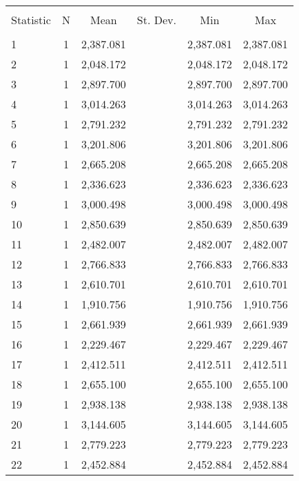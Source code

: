 
\begin{table}[!htbp] \centering 
  \caption{} 
  \label{} 
\begin{tabular}{@{\extracolsep{5pt}}lccccc} 
\\[-1.8ex]\hline 
\hline \\[-1.8ex] 
Statistic & \multicolumn{1}{c}{N} & \multicolumn{1}{c}{Mean} & \multicolumn{1}{c}{St. Dev.} & \multicolumn{1}{c}{Min} & \multicolumn{1}{c}{Max} \\ 
\hline \\[-1.8ex] 
1 & 1 & 2,387.081 &  & 2,387.081 & 2,387.081 \\ 
2 & 1 & 2,048.172 &  & 2,048.172 & 2,048.172 \\ 
3 & 1 & 2,897.700 &  & 2,897.700 & 2,897.700 \\ 
4 & 1 & 3,014.263 &  & 3,014.263 & 3,014.263 \\ 
5 & 1 & 2,791.232 &  & 2,791.232 & 2,791.232 \\ 
6 & 1 & 3,201.806 &  & 3,201.806 & 3,201.806 \\ 
7 & 1 & 2,665.208 &  & 2,665.208 & 2,665.208 \\ 
8 & 1 & 2,336.623 &  & 2,336.623 & 2,336.623 \\ 
9 & 1 & 3,000.498 &  & 3,000.498 & 3,000.498 \\ 
10 & 1 & 2,850.639 &  & 2,850.639 & 2,850.639 \\ 
11 & 1 & 2,482.007 &  & 2,482.007 & 2,482.007 \\ 
12 & 1 & 2,766.833 &  & 2,766.833 & 2,766.833 \\ 
13 & 1 & 2,610.701 &  & 2,610.701 & 2,610.701 \\ 
14 & 1 & 1,910.756 &  & 1,910.756 & 1,910.756 \\ 
15 & 1 & 2,661.939 &  & 2,661.939 & 2,661.939 \\ 
16 & 1 & 2,229.467 &  & 2,229.467 & 2,229.467 \\ 
17 & 1 & 2,412.511 &  & 2,412.511 & 2,412.511 \\ 
18 & 1 & 2,655.100 &  & 2,655.100 & 2,655.100 \\ 
19 & 1 & 2,938.138 &  & 2,938.138 & 2,938.138 \\ 
20 & 1 & 3,144.605 &  & 3,144.605 & 3,144.605 \\ 
21 & 1 & 2,779.223 &  & 2,779.223 & 2,779.223 \\ 
22 & 1 & 2,452.884 &  & 2,452.884 & 2,452.884 \\ 

\end{tabular}
\end{table}
